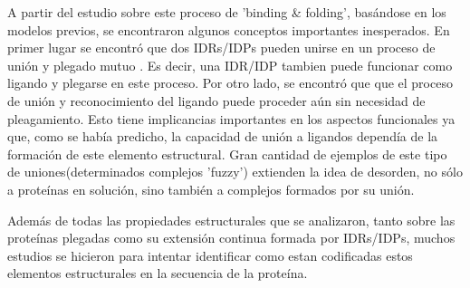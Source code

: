 
A partir del estudio sobre este proceso de 'binding \& folding', basándose en los modelos previos, se encontraron algunos conceptos importantes inesperados.
En primer lugar se encontró que dos IDRs/IDPs  pueden unirse en un proceso de unión y plegado mutuo \cite{bhattacherjee2012coupled}. 
Es decir, una IDR/IDP tambien puede funcionar como ligando y plegarse en este proceso. 
Por otro lado, se encontró que que el proceso de unión y reconocimiento del ligando puede proceder aún sin necesidad de pleagamiento. 
Esto tiene implicancias importantes en los aspectos funcionales ya que, como se había predicho, la capacidad de unión a ligandos dependía de la formación de este elemento estructural.
Gran cantidad de ejemplos de este tipo de uniones(determinados complejos 'fuzzy') extienden la idea de desorden, no sólo a proteínas en solución, sino también a complejos formados por su unión. 













Además de todas las propiedades estructurales que se analizaron, tanto sobre las proteínas plegadas como su extensión continua formada por IDRs/IDPs,  
muchos estudios se hicieron para intentar identificar como estan codificadas estos elementos estructurales en la secuencia de la proteína.

